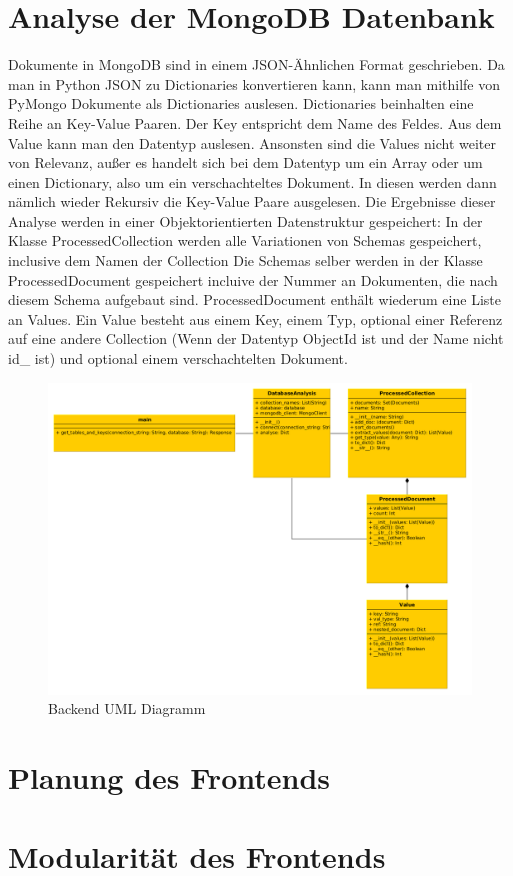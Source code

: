 \section{Analyse der MongoDB Datenbank}
\label{sec:mongoDB_analyse}

Dokumente in MongoDB sind in einem JSON-Ähnlichen Format geschrieben.
Da man in Python JSON zu Dictionaries konvertieren kann, kann man mithilfe von PyMongo Dokumente als Dictionaries auslesen.
Dictionaries beinhalten eine Reihe an Key-Value Paaren.
Der Key entspricht dem Name des Feldes.
Aus dem Value kann man den Datentyp auslesen.
Ansonsten sind die Values nicht weiter von Relevanz, außer es handelt sich bei dem Datentyp um ein Array oder um einen Dictionary, also um ein verschachteltes Dokument.
In diesen werden dann nämlich wieder Rekursiv die Key-Value Paare ausgelesen.
Die Ergebnisse dieser Analyse werden in einer Objektorientierten Datenstruktur gespeichert:
In der Klasse ProcessedCollection werden alle Variationen von Schemas gespeichert, inclusive dem Namen der Collection 
Die Schemas selber werden in der Klasse ProcessedDocument gespeichert incluive der Nummer an Dokumenten, die nach diesem Schema aufgebaut sind.
ProcessedDocument enthält wiederum eine Liste an Values.
Ein Value besteht aus einem Key, einem Typ, optional einer Referenz auf eine andere Collection (Wenn der Datentyp ObjectId ist und der Name nicht id\_ ist) und optional einem verschachtelten Dokument.

\begin{figure}[H]
    \includegraphics[width=\textwidth]{images/backend_uml}
    \caption{Backend UML Diagramm}
    \label{fig:backend_uml}
\end{figure}

\section{Planung des Frontends}
\label{sec:planung_frontend}

\section{Modularität des Frontends}
\label{sec:mod_frontend}
